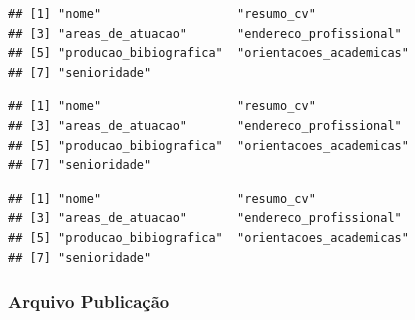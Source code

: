 \documentclass[]{article}
\newenvironment{Shaded}{\begin{snugshade}}{\end{snugshade}}
\newcommand{\KeywordTok}[1]{\textcolor[rgb]{0.13,0.29,0.53}{\textbf{#1}}}
\newcommand{\DataTypeTok}[1]{\textcolor[rgb]{0.13,0.29,0.53}{#1}}
\newcommand{\StringTok}[1]{\textcolor[rgb]{0.31,0.60,0.02}{#1}}
\newcommand{\CommentTok}[1]{\textcolor[rgb]{0.56,0.35,0.01}{\textit{#1}}}
\newcommand{\OperatorTok}[1]{\textcolor[rgb]{0.81,0.36,0.00}{\textbf{#1}}}
\newcommand{\NormalTok}[1]{#1}
\begin{document}
\begin{Shaded}
\end{Shaded}

\begin{verbatim}
## [1] "nome"                   "resumo_cv"             
## [3] "areas_de_atuacao"       "endereco_profissional" 
## [5] "producao_bibiografica"  "orientacoes_academicas"
## [7] "senioridade"
\end{verbatim}

\begin{Shaded}
\end{Shaded}

\begin{verbatim}
## [1] "nome"                   "resumo_cv"             
## [3] "areas_de_atuacao"       "endereco_profissional" 
## [5] "producao_bibiografica"  "orientacoes_academicas"
## [7] "senioridade"
\end{verbatim}

\begin{Shaded}
\end{Shaded}

\begin{verbatim}
## [1] "nome"                   "resumo_cv"             
## [3] "areas_de_atuacao"       "endereco_profissional" 
## [5] "producao_bibiografica"  "orientacoes_academicas"
## [7] "senioridade"
\end{verbatim}

\subsubsection{Arquivo Publicação}\label{arquivo-publicacao}
\end{document}

